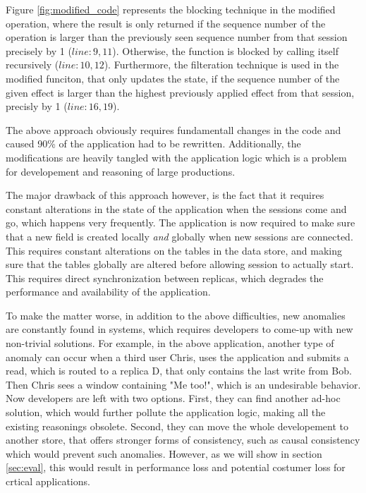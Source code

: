 Figure \ref{fig:modified_code} represents the blocking technique in the modified \readC{}
operation, where the result is only returned if the sequence number of
the operation is larger than the previously seen sequence number from
that session precisely by 1 ($line:9,11$). Otherwise, the function is blocked by
calling itself recursively ($line:10,12$).
Furthermore, the
filteration technique is used in the modified \applyC{} funciton, that only
updates the state, if the sequence number of the given effect is
larger than the highest previously applied effect from that session,  precisly
by 1 ($line:16,19$).


The above approach obviously requires fundamentall changes in the code
and caused 90\% of
the application had to be  rewritten. Additionally, the modifications are
heavily tangled with the application logic which is a problem for
developement and reasoning of large productions.

The major drawback of this approach however, is the fact that it requires
constant alterations in the state of the application when the sessions
come and go, which happens very frequently.
The application is now required to make
sure that a new field is created locally \emph{and} globally when 
new sessions are connected. This requires constant alterations on the
tables in the data store, and making sure that the tables globally are
altered before allowing session to actually start. This requires direct
synchronization between replicas, which degrades the performance and
availability of the application. 

To make the matter worse, in addition to the above difficulties,
new anomalies are constantly found in systems, which requires
developers to come-up with new non-trivial solutions. For example, in the
above application, another type of anomaly can occur when a third user
Chris, uses the application and submits a read, which is routed to a
replica D, that only contains the last write from Bob. Then Chris sees a
window containing "Me too!", which is an undesirable behavior. Now
developers are left with two options. First, they can find 
another ad-hoc solution, which would further pollute the
application logic, making all the existing reasonings obsolete. Second,
they can move the whole developement to another store, that offers
stronger forms of consistency, such as causal consistency which would
prevent such anomalies. However, as we will show in section
\ref{sec:eval}, this would result in performance loss and potential
costumer loss for crtical applications.

